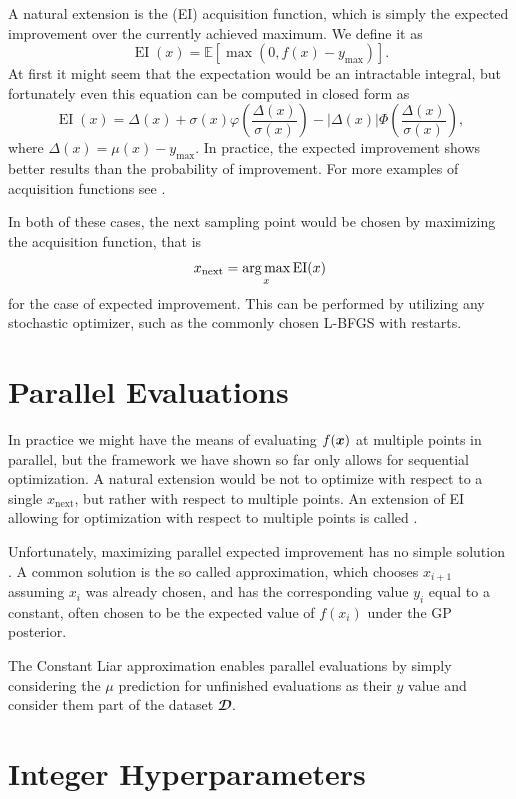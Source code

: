 A natural extension is the  (EI) acquisition function,
which is simply the expected improvement over the currently achieved maximum.
We define it as $$\operatorname{EI}(x) = 𝔼[\max(0, f(x) - y_{\max})].$$ At first it might seem that
the expectation would be an intractable integral, but fortunately even this
equation can be computed in closed form as
$$
\operatorname{EI}(x) = Δ(x) + σ(x) φ \left( \frac{Δ(x)}{σ(x)} \right) - |Δ(x)| Φ \left( \frac{Δ(x)}{σ(x)} \right),
$$
where $Δ(x) = μ(x) - y_{\max}$. In practice, the expected improvement shows better results
than the probability of improvement. For more examples of acquisition functions see
\cite{frazier2018tutorial}.

In both of these cases, the next sampling point would be chosen by maximizing
the acquisition function, that is $$x_{\operatorname{next}} = \operatorname*{arg\,max}_x \operatorname{EI}(x)$$ for
the case of expected improvement. This can be performed by utilizing any stochastic optimizer,
such as the commonly chosen L-BFGS with restarts.


\section{Parallel Evaluations}
\label{section:parallel-evaluations}

In practice we might have the means of evaluating $f({\boldsymbol{x}})$ at multiple points
in parallel, but the framework we have shown so far only allows for sequential
optimization. A natural extension would be not to optimize with respect
to a single $x_{\operatorname{next}}$, but rather with respect to multiple points. An extension
of EI allowing for optimization with respect to multiple points is called .

Unfortunately, maximizing parallel expected improvement has no simple solution \citep{frazier2018tutorial}. A
common solution is the so called  approximation, which
chooses $x_{i+1}$ assuming $x_i$ was already chosen, and has the corresponding
value $y_i$ equal to a constant, often chosen to be the expected value of
$f(x_i)$ under the GP posterior.

The Constant Liar approximation enables parallel evaluations by simply
considering the $μ$ prediction for unfinished evaluations as their $y$ value
and consider them part of the dataset $𝓓$.


\section{Integer Hyperparameters}

